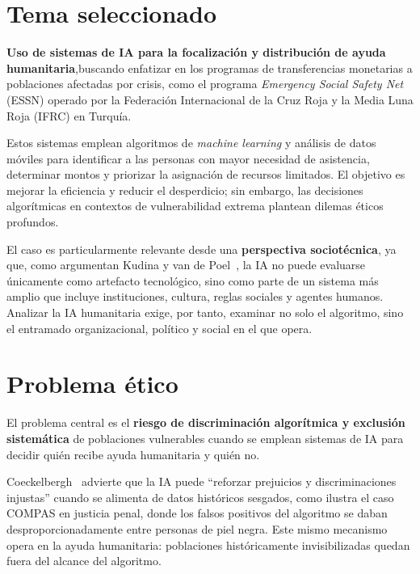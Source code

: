 \documentclass[12pt, a4paper]{article}
\begin{document}
\section{Tema seleccionado}

\textbf{Uso de sistemas de IA para la focalización y distribución de ayuda humanitaria},buscando enfatizar en los programas de transferencias monetarias a poblaciones afectadas por crisis, como el programa \textit{Emergency Social Safety Net} (ESSN) operado por la Federación Internacional de la Cruz Roja y la Media Luna Roja (IFRC) en Turquía.

Estos sistemas emplean algoritmos de \textit{machine learning} y análisis de datos móviles para identificar a las personas con mayor necesidad de asistencia, determinar montos y priorizar la asignación de recursos limitados. El objetivo es mejorar la eficiencia y reducir el desperdicio; sin embargo, las decisiones algorítmicas en contextos de vulnerabilidad extrema plantean dilemas éticos profundos.

El caso es particularmente relevante desde una \textbf{perspectiva sociotécnica}, ya que, como argumentan Kudina y van de Poel~\cite{kudina2024sociotechnical}, la IA no puede evaluarse únicamente como artefacto tecnológico, sino como parte de un sistema más amplio que incluye instituciones, cultura, reglas sociales y agentes humanos. Analizar la IA humanitaria exige, por tanto, examinar no solo el algoritmo, sino el entramado organizacional, político y social en el que opera.

\section{Problema ético}

El problema central es el \textbf{riesgo de discriminación algorítmica y exclusión sistemática} de poblaciones vulnerables cuando se emplean sistemas de IA para decidir quién recibe ayuda humanitaria y quién no.

Coeckelbergh~\cite{coeckelbergh2021etica} advierte que la IA puede ``reforzar prejuicios y discriminaciones injustas'' cuando se alimenta de datos históricos sesgados, como ilustra el caso COMPAS en justicia penal, donde los falsos positivos del algoritmo se daban desproporcionadamente entre personas de piel negra. Este mismo mecanismo opera en la ayuda humanitaria: poblaciones históricamente invisibilizadas quedan fuera del alcance del algoritmo.
\end{document}
